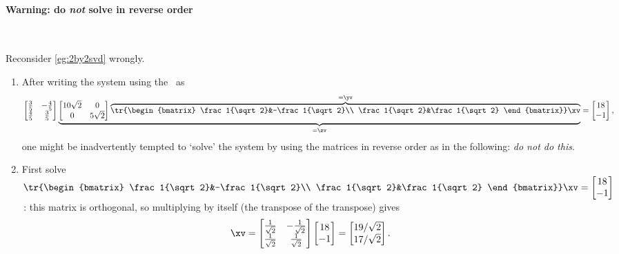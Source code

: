 \paragraph{Warning: do \emph{not} solve in reverse order} \ 
\begin{example} \label{eg:}
Reconsider \autoref{eg:2by2svd} wrongly.
\begin{enumerate}
\item 
After writing the system using the \svd\ as
\begin{equation*}
\begin{bmatrix} \frac35&-\frac45\\\frac45&\frac35 \end{bmatrix}
\underbrace{\begin{bmatrix} 10\sqrt2&0\\0&5\sqrt2 \end{bmatrix}
\overbrace{\tr{\begin{bmatrix} \frac1{\sqrt2}&-\frac1{\sqrt2}\\ \frac1{\sqrt2}&\frac1{\sqrt2} \end{bmatrix}}\xv}^{=\yv}}_{=\zv}=\begin{bmatrix} 18\\-1 \end{bmatrix},
\end{equation*}
one might be inadvertently tempted to `solve' the system by using the matrices in reverse order as in the following: \emph{do not do this}.

\item First solve \(\tr{\begin{bmatrix} \frac1{\sqrt2}&-\frac1{\sqrt2}\\ \frac1{\sqrt2}&\frac1{\sqrt2} \end{bmatrix}}\xv=\begin{bmatrix} 18\\-1 \end{bmatrix}\)\,:  this matrix is orthogonal, so multiplying by itself (the transpose of the transpose) gives 
\begin{equation*}
\xv=\begin{bmatrix} \frac1{\sqrt2}&-\frac1{\sqrt2}\\ \frac1{\sqrt2}&\frac1{\sqrt2} \end{bmatrix}
\begin{bmatrix} 18\\-1 \end{bmatrix}
=\begin{bmatrix} 19/\sqrt2\\17/\sqrt2 \end{bmatrix}.
\end{equation*}


\end{enumerate}
\end{example}
